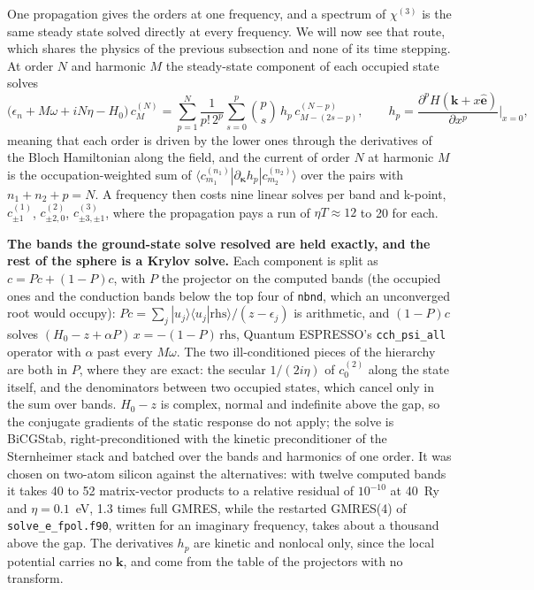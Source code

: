 \documentclass[11pt,a4paper]{article}
\newcommand{\code}[1]{\texttt{\small #1}}
\begin{document}
One propagation gives the orders at one frequency, and a spectrum of
$\chi^{(3)}$ is the same steady state solved directly at every frequency. We
will now see that route, which shares the physics of the previous subsection
and none of its time stepping. At order $N$ and harmonic $M$ the steady-state
component of each occupied state solves
\begin{equation*}
\big(\epsilon_n + M\omega + iN\eta - H_0\big)\,c^{(N)}_M
 = \sum_{p=1}^{N}\frac{1}{p!\,2^p}\sum_{s=0}^{p}\binom{p}{s}\,h_p\,
   c^{(N-p)}_{M-(2s-p)},\qquad
h_p = \frac{\partial^p H(\mathbf k + x\hat{\mathbf e})}{\partial x^p}\Big|_{x=0},
\end{equation*}
meaning that each order is driven by the lower ones through the derivatives of
the Bloch Hamiltonian along the field, and the current of order $N$ at harmonic
$M$ is the occupation-weighted sum of
$\langle c^{(n_1)}_{m_1}|\partial_{\boldsymbol\kappa}h_p|c^{(n_2)}_{m_2}\rangle$ over the
pairs with $n_1+n_2+p = N$. A frequency then costs nine linear solves per band
and k-point, $c^{(1)}_{\pm1}$, $c^{(2)}_{\pm2,0}$, $c^{(3)}_{\pm3,\pm1}$, where the
propagation pays a run of $\eta T\approx 12$ to 20 for each.

\textbf{The bands the ground-state solve resolved are held exactly, and the
rest of the sphere is a Krylov solve.} Each component is split as $c = Pc +
(1-P)c$, with $P$ the projector on the computed bands (the occupied ones and the
conduction bands below the top four of \code{nbnd}, which an unconverged root
would occupy): $Pc = \sum_j|u_j\rangle\langle u_j|\mathrm{rhs}\rangle/(z-\epsilon_j)$ is
arithmetic, and $(1-P)c$ solves $(H_0 - z + \alpha P)\,x = -(1-P)\,\mathrm{rhs}$,
Quantum ESPRESSO's \code{cch\_psi\_all} operator with $\alpha$ past every $M\omega$.
The two ill-conditioned pieces of the hierarchy are both in $P$, where they are
exact: the secular $1/(2i\eta)$ of $c^{(2)}_0$ along the state itself, and the
denominators between two occupied states, which cancel only in the sum over
bands. $H_0 - z$ is complex, normal and indefinite above the gap, so the
conjugate gradients of the static response do not apply; the solve is BiCGStab,
right-preconditioned with the kinetic preconditioner of the Sternheimer stack and
batched over the bands and harmonics of one order. It was chosen on two-atom
silicon against the alternatives: with twelve computed bands it takes 40 to 52
matrix-vector products to a relative residual of $10^{-10}$ at 40~Ry and
$\eta = 0.1$~eV, 1.3 times full GMRES, while the restarted GMRES(4) of
\code{solve\_e\_fpol.f90}, written for an imaginary frequency, takes about a
thousand above the gap. The derivatives $h_p$ are kinetic and nonlocal only,
since the local potential carries no $\mathbf k$, and come from the table of the
projectors with no transform.
\end{document}
